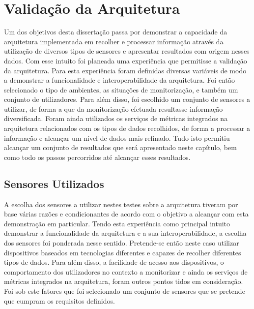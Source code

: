 \chapter{Validação da Arquitetura}

Um dos objetivos desta dissertação passa por demonstrar a capacidade da arquitetura implementada em recolher e processar informação através da utilização de diversos tipos de sensores e apresentar resultados com origem nesses dados. Com esse intuito foi planeada uma experiência que permitisse a validação da arquitetura. Para esta experiência foram definidas diversas variáveis de modo a demonstrar a funcionalidade e interoperabilidade da arquitetura. Foi então selecionado o tipo de ambientes, as situações de monitorização, e também um conjunto de utilizadores. Para além disso, foi escolhido um conjunto de sensores a utilizar, de forma a que da monitorização efetuada resultasse informação diversificada. Foram ainda utilizados os serviços de métricas integrados na arquitetura relacionados com os tipos de dados recolhidos, de forma a processar a informação e alcançar um nível de dados mais refinado. Tudo isto permitiu alcançar um conjunto de resultados que será apresentado neste capítulo, bem como todo os passos percorridos até alcançar esses resultados.


\section{Sensores Utilizados}

A escolha dos sensores a utilizar nestes testes sobre a arquitetura tiveram por base várias razões e condicionantes de acordo com o objetivo a alcançar com esta demonstração em particular. Tendo esta experiência como principal intuito demonstrar a funcionalidade da arquitetura e a sua interoperabilidade, a escolha dos sensores foi ponderada nesse sentido. Pretende-se então neste caso utilizar dispositivos baseados em tecnologias diferentes e capazes de recolher diferentes tipos de dados. Para além disso, a facilidade de acesso aos dispositivos, o comportamento dos utilizadores no contexto a monitorizar e ainda os serviços de métricas integrados na arquitetura, foram outros pontos tidos em consideração. Foi sob este fatores que foi selecionado um conjunto de sensores que se pretende que cumpram os requisitos definidos.

